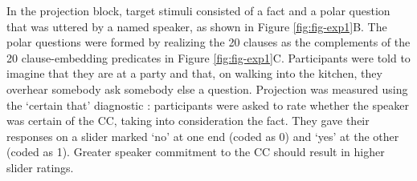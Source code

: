 \documentclass[OpenMind]{stjour}
\begin{document}
In the projection block, target stimuli consisted of a fact and a polar question that was uttered by a named speaker, as shown in Figure \ref{fig:fig-exp1}B. The polar questions were formed by realizing the 20 clauses as the complements of the 20 clause-embedding predicates in Figure \ref{fig:fig-exp1}C. Participants were told to imagine that they are at a party and that, on walking into the kitchen, they overhear somebody ask somebody else a question. Projection was measured using the `certain that' diagnostic \citep{djaerv-bacovcin-salt27,tbd-variability, lorson2018, mahler2020}: participants were asked to rate whether the speaker was certain of the CC, taking into consideration the fact. They gave their responses on a slider marked `no' at one end (coded as 0) and `yes' at the other (coded as 1). Greater speaker commitment to the CC should result in higher slider ratings.

%
%
%
\end{document}
